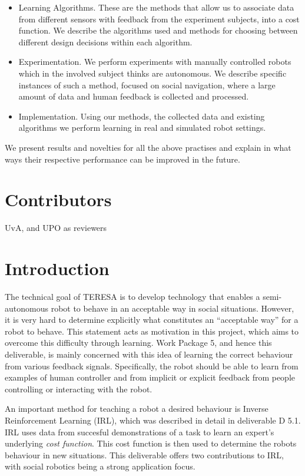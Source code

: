 \documentclass[a4paper,11pt]{report}
\begin{document}
\begin{itemize}
  \item Learning Algorithms. These are the methods that allow us to associate data from different sensors with feedback from the experiment subjects, into a cost function. We describe the algorithms used and methods for choosing between different design decisions within each algorithm.
  \item Experimentation. We perform experiments with manually 
controlled robots which in the involved subject thinks are autonomous. We describe 
specific instances of such a method, focused on social navigation, where a 
  large amount of data and human feedback is collected and processed.
  \item Implementation. Using our methods, the collected data and existing algorithms we perform learning in real and simulated robot settings.
\end{itemize}

We present results and novelties for all the above practises and explain in what 
ways their respective performance can be improved in the future.

\section{Contributors}\label{sec:cont}

UvA, and UPO as reviewers

\newpage

\section{Introduction}\label{sec:intro}

The technical goal of TERESA is to develop technology that enables a semi-autonomous robot to behave in an acceptable way in social situations. However, it is very hard to determine explicitly what constitutes an “acceptable way” for a robot to behave. This statement acts as motivation in this project, which aims to overcome this difficulty through learning. Work Package 5, and hence this deliverable, is mainly concerned with this idea of learning the correct behaviour from various feedback signals. Specifically, the robot should be able to learn from examples of human controller and from implicit or explicit feedback from people controlling or interacting with the robot.

An important method for teaching a robot a desired behaviour is Inverse Reinforcement Learning (IRL), which was described in detail in deliverable D 5.1. IRL uses data from succesful demonstrations of a task to learn an expert's underlying \emph{cost function}. This cost function is then used to determine the robots behaviour in new situations. This deliverable offers two contributions to IRL, with social robotics being a strong application focus.
\end{document}
